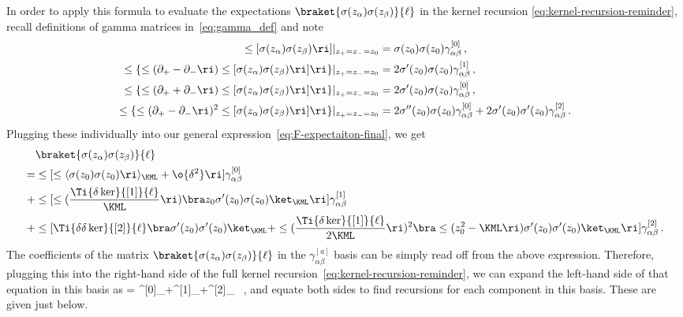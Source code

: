 In order to apply this formula to evaluate the expectations $\braket{\sigma(z_{\alpha}) \sigma(z_{\beta})}{\ell}$ in the kernel recursion \eqref{eq:kernel-recursion-reminder}, recall definitions of gamma matrices in~\eqref{eq:gamma_def} and note
\begin{align}
\le[\sigma(z_{\alpha}) \sigma(z_{\beta})\ri] \vert_{z_{+}=z_{-}=z_0}&=\sigma(z_0)\sigma(z_0) \gamma^{[0]}_{\alpha\beta}\, ,\\
\le\{\le(\partial_{+}-\partial_{-}\ri)\le[\sigma(z_{\alpha}) \sigma(z_{\beta})\ri] \ri\}\vert_{z_{+}=z_{-}=z_0}&=2\sigma'(z_0)\sigma(z_0) \gamma^{[1]}_{\alpha\beta}\, ,\\
\le\{\le(\partial_{+}+\partial_{-}\ri)\le[\sigma(z_{\alpha}) \sigma(z_{\beta})\ri] \ri\}\vert_{z_{+}=z_{-}=z_0}&=2\sigma'(z_0)\sigma(z_0) \gamma^{[0]}_{\alpha\beta}\, ,\\
\le\{\le(\partial_{+}-\partial_{-}\ri)^2\le[\sigma(z_{\alpha}) \sigma(z_{\beta})\ri] \ri\}\vert_{z_{+}=z_{-}=z_0}&=2\sigma''(z_0)\sigma(z_0)\gamma^{[0]}_{\alpha\beta}+2\sigma'(z_0)\sigma'(z_0)\gamma^{[2]}_{\alpha\beta}\, .
\end{align}
Plugging these individually into our general expression~\eqref{eq:F-expectaiton-final}, we get
\begin{align}
&\braket{\sigma(z_{\alpha}) \sigma(z_{\beta})}{\ell} \, \label{eq:useful-much-later-too}\\
=&\le[\le\langle \sigma(z_0)\sigma(z_0)\ri\rangle_{\KML}+\o{\delta^2}\ri] \gamma^{[0]}_{\alpha\beta}\, \nonumber\\
+&\le[\le(\frac{\Ti{\delta\ker}{[1]}{\ell}}{\KML}\ri)\bra z_0\sigma'(z_0)\sigma(z_0)\ket_{\KML}\ri] \gamma^{[1]}_{\alpha\beta}\,  \nonumber\\
+&\le[\Ti{\delta\delta\ker}{[2]}{\ell}\bra \sigma'(z_0)\sigma'(z_0)\ket_{\KML}+\le(\frac{\Ti{\delta \ker}{[1]}{\ell}}{2\KML}\ri)^2\bra\le(z_0^2-\KML\ri)\sigma'(z_0)\sigma'(z_0)\ket_{\KML}\ri] \gamma^{[2]}_{\alpha\beta}\, .\nonumber
\end{align}
The coefficients of the matrix $\braket{\sigma(z_{\alpha}) \sigma(z_{\beta})}{\ell}$ in the $\gamma^{[a]}_{\alpha\beta}$ basis can be simply read off from the above expression. Therefore, plugging this into the right-hand side of the full kernel recursion~\eqref{eq:kernel-recursion-reminder}, we can expand the left-hand side of that equation in this basis as
\be
{} = \gamma^{[0]}_{\alpha\beta}+\gamma^{[1]}_{\alpha\beta}+\gamma^{[2]}_{\alpha\beta} \, ,
\ee
and equate both sides to find recursions for each component in this basis. These are given just below.









